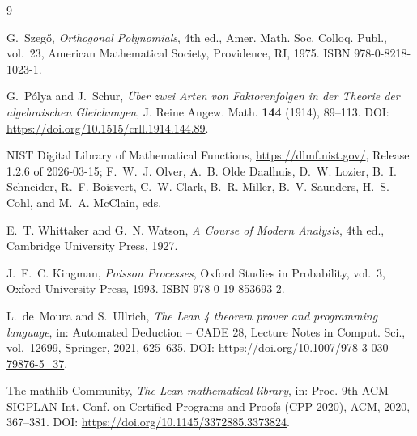 \documentclass[11pt]{amsart}
\theoremstyle{definition}
\theoremstyle{remark}
\begin{document}
\begin{thebibliography}{9}

G.~Szeg\H{o},
\emph{Orthogonal Polynomials},
4th ed., Amer. Math. Soc. Colloq. Publ., vol.~23,
American Mathematical Society, Providence, RI, 1975.
ISBN 978-0-8218-1023-1.

G.~P\'olya and J.~Schur,
\emph{\"Uber zwei Arten von Faktorenfolgen in der Theorie der
algebraischen Gleichungen},
J. Reine Angew. Math. \textbf{144} (1914), 89--113.
DOI: \url{https://doi.org/10.1515/crll.1914.144.89}.

NIST Digital Library of Mathematical Functions,
\url{https://dlmf.nist.gov/},
Release 1.2.6 of 2026-03-15; F.~W.~J. Olver,
A.~B. Olde Daalhuis, D.~W. Lozier, B.~I. Schneider,
R.~F. Boisvert, C.~W. Clark, B.~R. Miller,
B.~V. Saunders, H.~S. Cohl, and M.~A. McClain, eds.

E.~T. Whittaker and G.~N. Watson,
\emph{A Course of Modern Analysis},
4th ed., Cambridge University Press, 1927.

J.~F.~C. Kingman,
\emph{Poisson Processes},
Oxford Studies in Probability, vol.~3,
Oxford University Press, 1993.
ISBN 978-0-19-853693-2.

L.~de~Moura and S.~Ullrich,
\emph{The Lean 4 theorem prover and programming language},
in: Automated Deduction -- CADE 28,
Lecture Notes in Comput. Sci., vol.~12699, Springer, 2021, 625--635.
DOI: \url{https://doi.org/10.1007/978-3-030-79876-5_37}.

The mathlib Community,
\emph{The Lean mathematical library},
in: Proc. 9th ACM SIGPLAN Int. Conf. on Certified Programs and Proofs
(CPP 2020), ACM, 2020, 367--381.
DOI: \url{https://doi.org/10.1145/3372885.3373824}.

\end{thebibliography}
\end{document}
